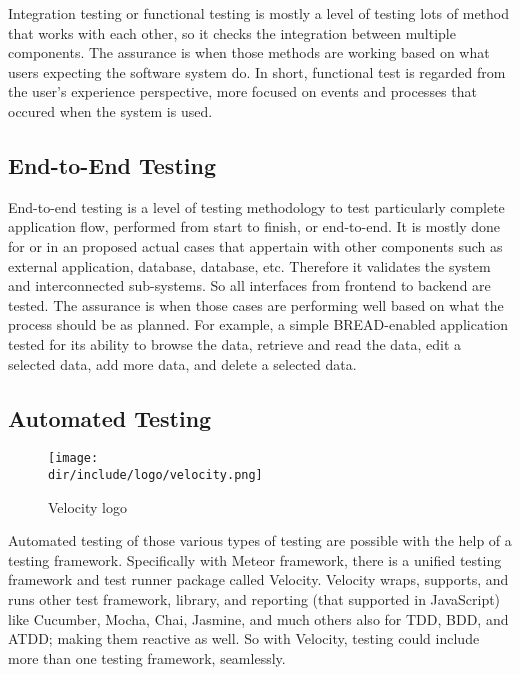 Integration testing or functional testing is mostly a level of testing lots of method that works with each other, so it checks the integration between multiple components.
The assurance is when those methods are working based on what users expecting the software system do.
In short, functional test is regarded from the user's experience perspective, more focused on events and processes that occured when the system is used.

\subsection{End-to-End Testing}

End-to-end testing is a level of testing methodology to test particularly complete application flow, performed from start to finish, or end-to-end.
It is mostly done for or in an proposed actual cases that appertain with other components such as external application, database, database, etc.
Therefore it validates the system and interconnected sub-systems.
So all interfaces from frontend to backend are tested.
The assurance is when those cases are performing well based on what the process should be as planned.
For example, a simple \ac{BREAD}-enabled application tested for its ability to browse the data, retrieve and read the data, edit a selected data, add more data, and delete a selected data.

\subsection{Automated Testing}

\begin{wrapfigure}{r}{0.5\textwidth}
  \vspace{-20pt}
  \begin{center}
    \texttt{[image: \\dir/include/logo/velocity.png]}
  \end{center}
  \vspace{-20pt}
  \caption{Velocity logo}
  \label{fig:velocity-logo}
  \vspace{-10pt}
\end{wrapfigure}

Automated testing of those various types of testing are possible with the help of a testing framework.
Specifically with Meteor framework, there is a unified testing framework and test runner package called Velocity.
Velocity wraps, supports, and runs other test framework, library, and reporting (that supported in JavaScript) like Cucumber, Mocha, Chai, Jasmine, and much others also for \ac{TDD}, \ac{BDD}, and \ac{ATDD}; making them reactive as well.
So with Velocity, testing could include more than one testing framework, seamlessly.

